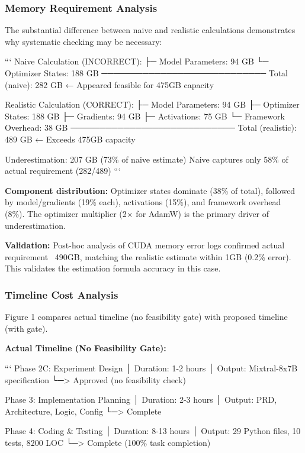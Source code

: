 \subsubsection{Memory Requirement Analysis}

The substantial difference between naive and realistic calculations demonstrates why systematic checking may be necessary:

```
Naive Calculation (INCORRECT):
├─ Model Parameters:        94 GB
└─ Optimizer States:       188 GB
   ────────────────────────────
   Total (naive):          282 GB  ← Appeared feasible for 475GB capacity

Realistic Calculation (CORRECT):
├─ Model Parameters:        94 GB
├─ Optimizer States:       188 GB
├─ Gradients:               94 GB
├─ Activations:             75 GB
└─ Framework Overhead:      38 GB
   ────────────────────────────
   Total (realistic):      489 GB  ← Exceeds 475GB capacity

Underestimation: 207 GB (73\% of naive estimate)
Naive captures only 58\% of actual requirement (282/489)
```

\textbf{Component distribution:} Optimizer states dominate (38\% of total), followed by model/gradients (19\% each), activations (15\%), and framework overhead (8\%). The optimizer multiplier (2× for AdamW) is the primary driver of underestimation.

\textbf{Validation:} Post-hoc analysis of CUDA memory error logs confirmed actual requirement ~490GB, matching the realistic estimate within 1GB (0.2\% error). This validates the estimation formula accuracy in this case.

\subsubsection{Timeline Cost Analysis}

Figure 1 compares actual timeline (no feasibility gate) with proposed timeline (with gate).

\textbf{Actual Timeline (No Feasibility Gate):}

```
Phase 2C: Experiment Design
│ Duration: 1-2 hours
│ Output: Mixtral-8x7B specification
└─> Approved (no feasibility check)

Phase 3: Implementation Planning  
│ Duration: 2-3 hours
│ Output: PRD, Architecture, Logic, Config
└─> Complete

Phase 4: Coding \& Testing
│ Duration: 8-13 hours  
│ Output: 29 Python files, 10 tests, 8200 LOC
└─> Complete (100\% task completion)

